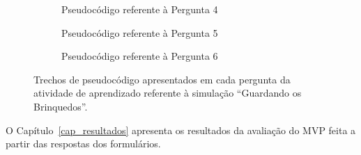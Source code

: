 \begin{figure}[h!]
\begin{subfigure}[t]{0.5\textwidth}
        \caption{Pseudocódigo referente à Pergunta 4}
        \label{figure:atividade_brinquedos_4}
    \end{subfigure}
    \par\bigskip %
    \begin{subfigure}[t]{0.5\textwidth}
        \centering
        \setlength{\fboxrule}{0.1pt} %
        \caption{Pseudocódigo referente à Pergunta 5}
        \label{figure:atividade_brinquedos_5}
    \end{subfigure}
    \par\bigskip %
    \begin{subfigure}[t]{0.5\textwidth}
        \centering
        \setlength{\fboxrule}{0.1pt} %
        \caption{Pseudocódigo referente à Pergunta 6}
        \label{figure:atividade_brinquedos_6}
    \end{subfigure}
    \caption{Trechos de pseudocódigo apresentados em cada pergunta da atividade de aprendizado referente à simulação \enquote{Guardando os Brinquedos}.}
    \label{figure:atividade_brinquedos}
\end{figure}

O Capítulo~\ref{cap_resultados} apresenta os resultados da avaliação do MVP feita a partir das respostas dos formulários.
